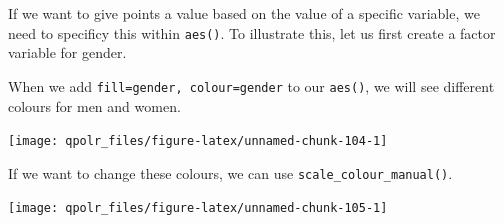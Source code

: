 \documentclass[12pt,oneside]{reedthesis}
\theoremstyle{definition}
\theoremstyle{definition}
\theoremstyle{definition}
\theoremstyle{remark}
\begin{document}
  If we want to give points a value based on the value of a specific
  variable, we need to specificy this within \texttt{aes()}. To illustrate
  this, let us first create a factor variable for gender.
  \begin{Shaded}
  \begin{Highlighting}[]
  \OperatorTok{$}\StringTok{ }\OperatorTok{$}\OperatorTok{==}\StringTok{ }\NormalTok{, }\NormalTok{, }\NormalTok{)}
  \end{Highlighting}
  \end{Shaded}
  When we add \texttt{fill=gender,\ colour=gender} to our \texttt{aes()},
  we will see different colours for men and women.
  \begin{Shaded}
  \begin{Highlighting}[]
  \NormalTok{(}\OperatorTok{+}
  \StringTok{  }\NormalTok{(} \NormalTok{) }\OperatorTok{+}\StringTok{ }
  \StringTok{  }\NormalTok{(}\NormalTok{, }\NormalTok{) }\OperatorTok{+}
  \StringTok{  }\NormalTok{()}
  \end{Highlighting}
  \end{Shaded}
  \begin{center}\texttt{[image: qpolr\_files/figure-latex/unnamed-chunk-104-1]} \end{center}
  
  If we want to change these colours, we can use
  \texttt{scale\_colour\_manual()}.
  \begin{Shaded}
  \begin{Highlighting}[]
  \NormalTok{(}\OperatorTok{+}
  \StringTok{  }\NormalTok{(} \NormalTok{) }\OperatorTok{+}\StringTok{ }
  \StringTok{  }\NormalTok{(}\NormalTok{, }\NormalTok{) }\OperatorTok{+}
  \StringTok{  }\NormalTok{(} \NormalTok{(}\NormalTok{, }\NormalTok{)) }\OperatorTok{+}
  \StringTok{  }\NormalTok{()}
  \end{Highlighting}
  \end{Shaded}
  \begin{center}\texttt{[image: qpolr\_files/figure-latex/unnamed-chunk-105-1]} \end{center}
  
\end{document}
